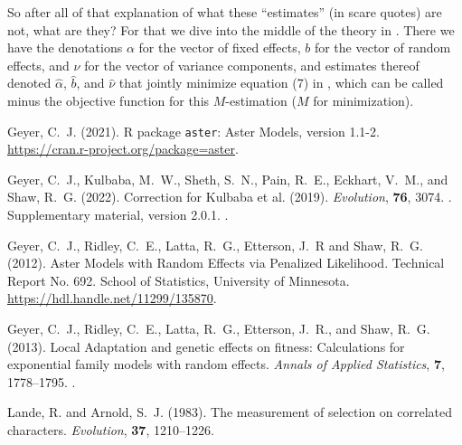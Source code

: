 \documentclass[11pt]{article}
\begin{document}
So after all of that explanation of what these ``estimates'' (in scare quotes)
are not, what are they?  For that we dive into the middle of the theory in
\citet[Section~2]{reaster}.  There we have the denotations $\alpha$ for
the vector of fixed effects, $b$ for the vector of random effects,
and $\nu$ for the vector of variance components, and estimates thereof
denoted $\hat{\alpha}$, $\hat{b}$, and $\hat{\nu}$ that jointly minimize
equation (7) in \citet{reaster}, which can be called minus the
objective function for this $M$-estimation ($M$ for minimization).



\begin{thebibliography}{}

Geyer, C.~J. (2021).
\newblock R package \texttt{aster}: Aster Models, version 1.1-2.
\newblock \url{https://cran.r-project.org/package=aster}.

Geyer, C.~J., Kulbaba, M.~W., Sheth, S.~N., Pain, R.~E., Eckhart, V.~M.,
    and Shaw, R.~G. (2022).
\newblock Correction for Kulbaba et al. (2019).
\newblock \emph{Evolution}, \textbf{76}, 3074.
\newblock {}.
\newblock Supplementary material, version 2.0.1.
\newblock {}.

Geyer, C.~J., Ridley, C.~E., Latta, R.~G., Etterson, J.~R and Shaw, R.~G.
    (2012).
\newblock Aster Models with Random Effects via Penalized Likelihood.
\newblock Technical Report No. 692.  School of Statistics,
    University of Minnesota.
\newblock \url{https://hdl.handle.net/11299/135870}.

Geyer, C.~J., Ridley, C.~E., Latta, R.~G., Etterson, J.~R., and Shaw, R.~G.
    (2013).
\newblock Local Adaptation and genetic effects on fitness: Calculations for
    exponential family models with random effects.
\newblock \emph{Annals of Applied Statistics}, \textbf{7}, 1778--1795.
\newblock {}.

Lande, R. and Arnold, S.~J. (1983).
\newblock The measurement of selection on correlated characters.
\newblock \emph{Evolution}, \textbf{37}, 1210--1226.

\end{thebibliography}
\end{document}

